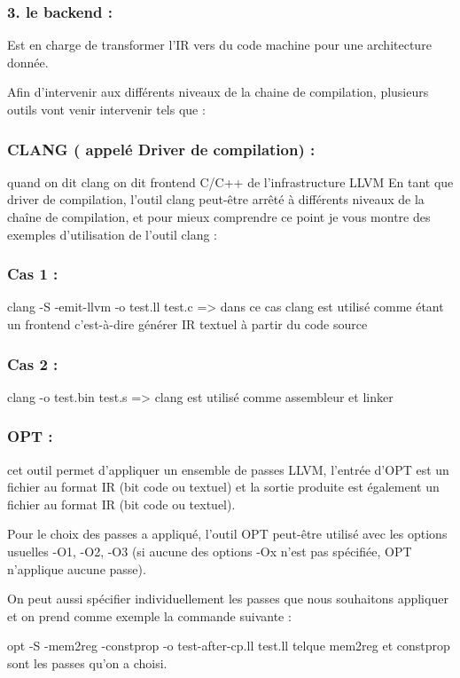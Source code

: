 \documentclass[12pt,titlepage]{article}
\begin{document}
    \subsubsection{3. le backend :}
    Est en charge de transformer l’IR vers du code machine pour une architecture donnée.

Afin d’intervenir aux différents niveaux de la chaine de compilation, plusieurs outils vont venir intervenir tels que :

   \subsubsection{ CLANG ( appelé Driver de compilation) :} quand on dit clang on dit frontend C/C++ de l’infrastructure LLVM
En tant que driver de compilation, l’outil clang peut-être arrêté à différents niveaux de la chaîne de compilation, et pour mieux comprendre ce point je vous montre des exemples d’utilisation de l’outil clang :
      
\subsubsection {Cas 1 : } clang -S -emit-llvm -o test.ll test.c => dans ce cas clang est utilisé comme étant un frontend c'est-à-dire générer IR textuel à partir du code source 
      
      \subsubsection{Cas 2 : }clang -o test.bin test.s => clang est utilisé comme assembleur et linker 
      
      
    \subsubsection{ OPT :} cet outil permet d’appliquer un ensemble de passes LLVM, l’entrée d'OPT est un fichier au format IR (bit code ou textuel) et la sortie produite est également un fichier au format IR (bit code ou textuel).
      
Pour le choix des passes a appliqué, l’outil OPT peut-être utilisé avec les options usuelles -O1, -O2, -O3 (si aucune des options -Ox n’est pas spécifiée, OPT n’applique aucune passe).
      
      On peut aussi spécifier individuellement les passes que nous souhaitons appliquer et on prend comme exemple la commande suivante  :
      
      opt -S -mem2reg -constprop -o test-after-cp.ll test.ll
      telque mem2reg  et constprop  sont les passes qu’on a choisi.
\end{document}
